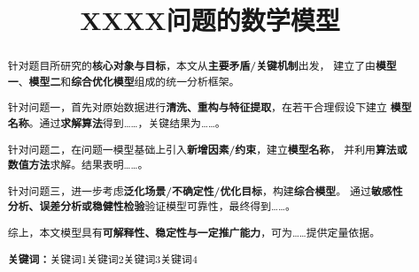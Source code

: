 \documentclass[UTF8,fontset=none,a4paper,12pt]{ctexart}
\title{\sffamily\bfseries\zihao{2} XXXX问题的数学模型}
\author{}
\date{}
\providecommand{\keywords}[1]{\par\vspace{0.5em}\noindent\textbf{关键词：}#1}
\begin{document}
%

\maketitle

\begin{abstract}
%

针对题目所研究的\textbf{核心对象与目标}，本文从\textbf{主要矛盾/关键机制}出发，
建立了由\textbf{模型一}、\textbf{模型二}和\textbf{综合优化模型}组成的统一分析框架。

针对问题一，首先对原始数据进行\textbf{清洗、重构与特征提取}，在若干合理假设下建立
\textbf{模型名称}。通过\textbf{求解算法}得到……，关键结果为……。

针对问题二，在问题一模型基础上引入\textbf{新增因素/约束}，建立\textbf{模型名称}，
并利用\textbf{算法或数值方法}求解。结果表明……。

针对问题三，进一步考虑\textbf{泛化场景/不确定性/优化目标}，构建\textbf{综合模型}。
通过\textbf{敏感性分析、误差分析或稳健性检验}验证模型可靠性，最终得到……。

综上，本文模型具有\textbf{可解释性、稳定性与一定推广能力}，可为……提供定量依据。

\keywords{关键词1\quad 关键词2\quad 关键词3\quad 关键词4}
\end{abstract}

\end{document}

